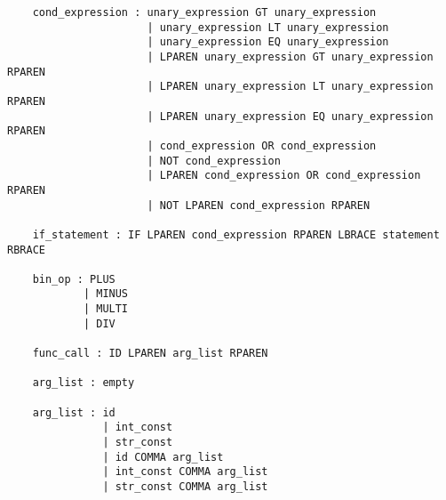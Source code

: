 \documentclass[11pt, pdftex]{article}
\begin{document}
\begin{lstlisting}
    cond_expression : unary_expression GT unary_expression
                      | unary_expression LT unary_expression
                      | unary_expression EQ unary_expression
                      | LPAREN unary_expression GT unary_expression RPAREN
                      | LPAREN unary_expression LT unary_expression RPAREN
                      | LPAREN unary_expression EQ unary_expression RPAREN
                      | cond_expression OR cond_expression
                      | NOT cond_expression
                      | LPAREN cond_expression OR cond_expression RPAREN
                      | NOT LPAREN cond_expression RPAREN

    if_statement : IF LPAREN cond_expression RPAREN LBRACE statement RBRACE
                                 
    bin_op : PLUS
            | MINUS
            | MULTI
            | DIV
                       
    func_call : ID LPAREN arg_list RPAREN

    arg_list : empty

    arg_list : id
               | int_const
               | str_const
               | id COMMA arg_list
               | int_const COMMA arg_list
               | str_const COMMA arg_list
\end{lstlisting}
\end{document}
